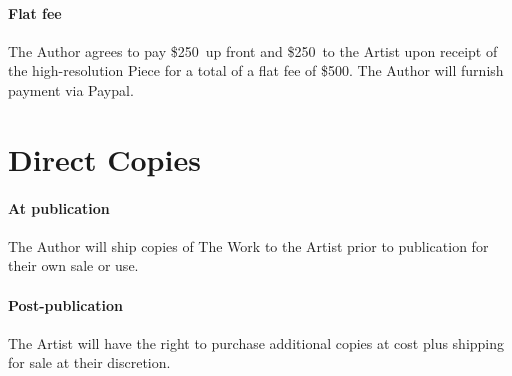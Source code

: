 \documentclass[12pt,letterpaper]{article}
\def\UpFront{\$250}
\def\AtCompletion{\$250}
\def\FlatFee{\$500}
\def\PrintRoyalties{25\%}
\def\DigitalRoyalties{50\%}
\def\PaymentMechanism{Paypal} %
\begin{document}
\paragraph{Flat fee}

The Author agrees to pay \UpFront\ up front and \AtCompletion\ to the Artist upon receipt of the high-resolution Piece for a total of a flat fee of \FlatFee. The Author will furnish payment via \PaymentMechanism.

%
%
%
%
%
%
%

\section{Direct Copies}

\paragraph{At publication} The Author will ship copies of The Work to the Artist prior to publication for their own sale or use.

\paragraph{Post-publication} The Artist will have the right to purchase additional copies at cost plus shipping for sale at their discretion.
\end{document}
